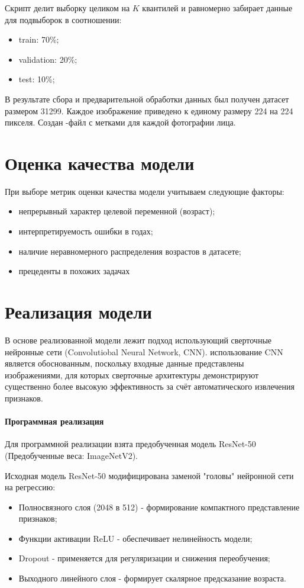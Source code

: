 Скрипт делит выборку целиком на $K$ квантилей и равномерно забирает данные для подвыборок в соотношении:
\begin{itemize}
	\item train: 70\%;
	\item validation: 20\%;
	\item test: 10\%;
\end{itemize}

В результате сбора и предварительной обработки данных был получен датасет размером 31299. Каждое изображение приведено к единому размеру 224 на 224 пикселя. Создан -файл с метками для каждой фотографии лица.

\chapter{Оценка качества модели}
При выборе метрик оценки качества модели учитываем следующие факторы:
\begin{itemize}
	\item непрерывный характер целевой переменной (возраст);
	\item интерпретируемость ошибки в годах;
	\item наличие неравномерного распределения возрастов в датасете;
	\item прецеденты в похожих задачах \cite{app151810212}
\end{itemize}


\chapter{Реализация модели}
В основе реализованной модели лежит подход использующий сверточные нейронные сети (Convolutiobal Neural Network, CNN). использование CNN является обоснованным, поскольку входные данные представлены изображениями, для которых сверточные архитектуры демонстрируют существенно более высокую эффективность за счёт автоматического извлечения признаков.
\subsubsection*{Программная реализация}
Для программной реализации взята предобученная модель ResNet-50 (Предобученные веса: ImageNetV2).


Исходная модель ResNet-50 модифицирована заменой "головы" нейронной сети на регрессию:
\begin{itemize}
	\item Полносвязного слоя (2048 в 512) - формирование компактного представление признаков;
	\item Функции активации ReLU - обеспечивает нелинейность модели;
	
	\item Dropout - применяется для регуляризации и снижения переобучения;
	
	\item Выходного линейного слоя - формирует скалярное предсказание возраста.
\end{itemize}


